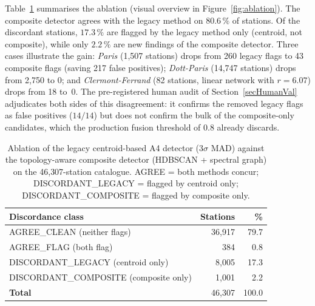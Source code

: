 \documentclass[11pt,a4paper]{article}
\begin{document}
Table~\ref{tab:ablation} summarises the ablation (visual overview in
Figure~\ref{fig:ablation}). The composite detector agrees with the
legacy method on $80.6\,\%$ of stations.
Of the discordant stations, $17.3\,\%$ are flagged by the
legacy method only (centroid, not composite), while only
$2.2\,\%$ are new findings of the composite detector. Three cases
illustrate the gain: \emph{Paris} (1{,}507 stations) drops from 260
legacy flags to 43 composite flags (saving 217 false positives);
\emph{Dott-Paris} (14{,}747 stations) drops from 2{,}750 to 0; and
\emph{Clermont-Ferrand} (82 stations, linear network with $r = 6.07$)
drops from 18 to~0. The pre-registered human audit of
Section~\ref{secHumanVal} adjudicates both sides of this disagreement:
it confirms the removed legacy flags as false positives ($14/14$) but
does not confirm the bulk of the composite-only candidates, which the
production fusion threshold of $0.8$ already discards.

\begin{table}[!htbp]
\centering
\caption{Ablation of the legacy centroid-based A4 detector (3$\sigma$
MAD) against the topology-aware composite detector (HDBSCAN +
spectral graph) on the 46{,}307-station catalogue. AGREE = both
methods concur; DISCORDANT\_LEGACY = flagged by centroid only;
DISCORDANT\_COMPOSITE = flagged by composite only.}
\label{tab:ablation}
\small
\begin{tabular}{@{}lrr@{}}
\toprule
\textbf{Discordance class} & \textbf{Stations} & \textbf{\%}\\
\midrule
AGREE\_CLEAN (neither flags) & 36{,}917 & 79.7 \\
AGREE\_FLAG (both flag)      &    384 &  0.8 \\
DISCORDANT\_LEGACY (centroid only)   &  8{,}005 & 17.3 \\
DISCORDANT\_COMPOSITE (composite only) & 1{,}001 &  2.2 \\
\midrule
\textbf{Total}               & 46{,}307 & 100.0 \\
\bottomrule
\end{tabular}
\end{table}

\end{document}
